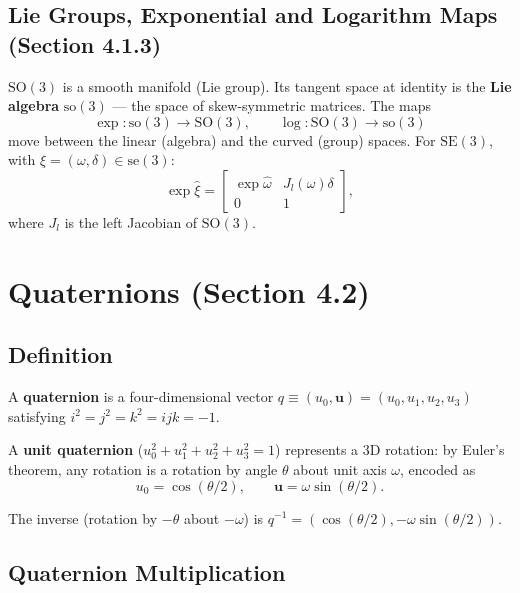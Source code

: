 \documentclass[12pt, a4paper]{article}
\begin{document}
\subsection{Lie Groups, Exponential and Logarithm Maps (Section 4.1.3)}

$\mathrm{SO}(3)$ is a smooth manifold (Lie group). Its tangent space at
identity is the \textbf{Lie algebra} $\mathrm{so}(3)$ --- the space of
skew-symmetric matrices. The maps
\begin{equation}
  \exp: \mathrm{so}(3) \to \mathrm{SO}(3), \qquad \log: \mathrm{SO}(3)\to\mathrm{so}(3)
\end{equation}
move between the linear (algebra) and the curved (group) spaces.
For $\mathrm{SE}(3)$, with $\xi=(\omega,\delta)\in\mathrm{se}(3)$:
\begin{equation}
  \exp\hat{\xi} = \begin{bmatrix}\exp\hat{\omega} & J_l(\omega)\delta\\ 0 & 1\end{bmatrix},
\end{equation}
where $J_l$ is the left Jacobian of $\mathrm{SO}(3)$.

\section{Quaternions (Section 4.2)}

\subsection{Definition}

A \textbf{quaternion} is a four-dimensional vector
$q\equiv(u_0,\mathbf{u})=(u_0,u_1,u_2,u_3)$ satisfying
$i^2=j^2=k^2=ijk=-1$.

A \textbf{unit quaternion} ($u_0^2+u_1^2+u_2^2+u_3^2=1$) represents a
3D rotation: by Euler's theorem, any rotation is a rotation by angle
$\theta$ about unit axis $\omega$, encoded as
\begin{equation}
  u_0 = \cos(\theta/2), \qquad \mathbf{u} = \omega\sin(\theta/2).
  \label{eq:q_axis_angle}
\end{equation}

The inverse (rotation by $-\theta$ about $-\omega$) is
$q^{-1}=(\cos(\theta/2),-\omega\sin(\theta/2))$.

\subsection{Quaternion Multiplication}
\end{document}
